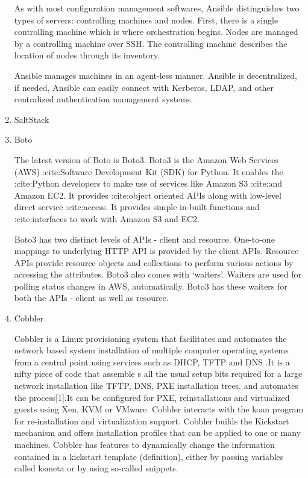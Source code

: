\begin{enumerate}
As with most configuration management softwares, Ansible
distinguishes two types of servers: controlling machines and
nodes. First, there is a single controlling machine which is
where orchestration begins. Nodes are managed by a controlling
machine over SSH. The controlling machine describes the location
of nodes through its inventory.

Ansible manages machines in an agent-less manner. Ansible is
decentralized, if needed, Ansible can easily connect with
Kerberos, LDAP, and other centralized authentication management
systems.

\item {} 
SaltStack

\item {} 
Boto

\label{\detokenize{i524/technologies:id581}}{\hyperref[\detokenize{i524/technologies:www-boto}]{\sphinxcrossref{{[}499{]}}}} The latest version of Boto is Boto3.
\label{\detokenize{i524/technologies:id582}}{\hyperref[\detokenize{i524/technologies:www-boto-github}]{\sphinxcrossref{{[}500{]}}}} Boto3 is the Amazon Web Services (AWS)
:cite:Software Development Kit (SDK) for Python. It enables the
:cite:Python developers to make use of services like Amazon S3
:cite:and Amazon EC2.   It provides
:cite:object oriented APIs along with low-level direct service
:cite:access. It provides simple in-built functions and
:cite:interfaces to work with Amazon S3 and EC2.

\label{\detokenize{i524/technologies:id583}}{\hyperref[\detokenize{i524/technologies:www-boto-amazon-python-sdk}]{\sphinxcrossref{{[}501{]}}}} Boto3 has two distinct levels of APIs
- client and resource. One-to-one mappings to underlying HTTP API
is provided by the client APIs. Resource APIs provide resource
objects and collections to perform various actions by accessing
the attributes.  Boto3 also comes with `waiters'. Waiters are
used for polling status changes in AWS, automatically. Boto3 has
these waiters for both the APIs
- client as well as resource.

\item {} 
Cobbler

Cobbler is a Linux provisioning system that facilitates and
automates the network based system installation of multiple computer
operating systems from a central point using services such as DHCP,
TFTP and DNS \label{\detokenize{i524/technologies:id584}}{\hyperref[\detokenize{i524/technologies:www-cobbler}]{\sphinxcrossref{{[}502{]}}}}.It is a nifty piece of code that
assemble s all the usual
setup bits required for a large network installation like TFTP, DNS,
PXE installation trees. and automates the process{[}1{]}.It can be
configured for PXE, reinstallations and virtualized guests using Xen,
KVM or VMware.  Cobbler interacts with the koan program for
re-installation and virtualization support.  Cobbler builds the
Kickstart mechanism and offers installation profiles that can be
applied to one or many machines.  Cobbler has features to dynamically
change the information contained in a kickstart template (definition),
either by passing variables called ksmeta or by using so-called
snippets.


\end{enumerate}
